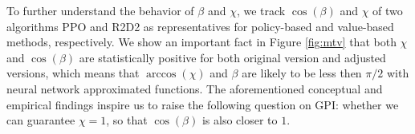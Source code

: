 To further understand the behavior of $\beta$ { and $\chi$}, we track $\cos(\beta)$ { and $\chi$} of two algorithms PPO and R2D2  as representatives for policy-based and value-based methods, respectively. We show an important fact in Figure \ref{fig:mtv} that { both $\chi$ and $\cos(\beta)$ are statistically positive for both original version and adjusted versions,
which means that $\arccos(\chi)$ and $\beta$ are likely to be less then $\pi / 2$ with neural network approximated functions.}
The aforementioned conceptual and empirical findings  inspire us to raise the following question on GPI:
{ whether we can guarantee $\chi = 1$, so that $\cos(\beta)$ is also closer to $1$.}

